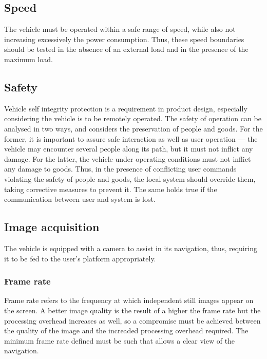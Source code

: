 \subsection{Speed}%
\label{sec:speed-tests}
The vehicle must be operated within a safe range of speed, while also not increasing excessively the power consumption. Thus, these speed boundaries should be tested in the absence of an external load and in the presence of the maximum load.
\subsection{Safety}%
\label{sec:org83942c3}
Vehicle self integrity protection is a requirement in product design, especially considering the vehicle is to
be remotely operated. The safety of operation can be analysed in two ways, and considers the
preservation of people and goods. For the former, it is important to assure safe interaction as well as user operation --- the vehicle may encounter
several people along its path, but it must not inflict any damage. For the
latter, the vehicle under operating conditions must not inflict any damage to
goods. Thus, in the presence of conflicting user commands violating the safety
of people and goods, the local system should override them, taking corrective
measures to prevent it. The same holds true if the communication between user
and system is lost.
\subsection{Image acquisition}%
\label{sec:image-acquisit}
The vehicle is equipped with a camera to assist in its navigation,
thus, requiring it to be fed to the user's platform appropriately.
\subsubsection{Frame rate}%
\label{sec:org5adf4ee}
Frame rate refers to the frequency at which independent still images appear on the screen. A better image quality is the result of a higher the frame rate but the processing overhead increases as well, so a compromise must be achieved between the quality of the image and the increaded processing overhead required. The minimum frame rate defined must be such that allows a clear view of the navigation.
